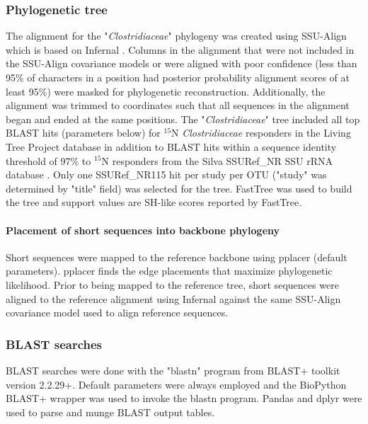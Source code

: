 \subsubsection{Phylogenetic tree}
The alignment for the "\textit{Clostridiaceae}" phylogeny was created using
SSU-Align which is based on Infernal \citep{24008419, 19307242}. Columns in the
alignment that were not included in the SSU-Align covariance models or were
aligned with poor confidence (less than 95\% of characters in a position had
posterior probability alignment scores of at least 95\%) were masked for
phylogenetic reconstruction. Additionally, the alignment was trimmed to
coordinates such that all sequences in the alignment began and ended at the
same positions. The "\textit{Clostridiaceae}" tree included all top BLAST hits
(parameters below) for $^{15}$N \textit{Clostridiaceae} responders in the
Living Tree Project database \citep{Yarza_2008} in addition to BLAST hits
within a sequence identity
threshold of 97\% to $^{15}$N responders from the Silva SSURef\_NR SSU rRNA
database \citep{17947321}. Only one SSURef\_NR115 hit per study per OTU
("study" was determined by "title" field) was selected for the tree. FastTree
\citep{20224823} was used to build the tree and support values are
SH-like scores reported by FastTree.

\paragraph{Placement of short sequences into backbone phylogeny}
Short sequences were mapped to the reference backbone using pplacer
\citep{Matsen_2010} (default parameters). pplacer finds the edge placements
that maximize phylogenetic likelihood. Prior to being mapped to the reference
tree, short sequences were aligned to the reference alignment using Infernal
\citep{19307242} against the same SSU-Align covariance model used to align
reference sequences.

\subsubsection{BLAST searches}
BLAST searches were done with the "blastn" program from BLAST+ toolkit
\citep{20003500} version 2.2.29+. Default parameters were always employed and
the BioPython \citep{19304878} BLAST+ wrapper was used to invoke the blastn
program. Pandas \citep{citeulike:11241428} and dplyr \citep{dplyr} were used to
parse and munge BLAST output tables.  

